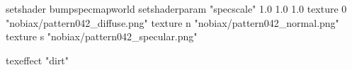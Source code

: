 setshader bumpspecmapworld
setshaderparam "specscale" 1.0 1.0 1.0
   texture 0 "nobiax/pattern042_diffuse.png"
   texture n "nobiax/pattern042_normal.png"
   texture s "nobiax/pattern042_specular.png"

texeffect "dirt"
